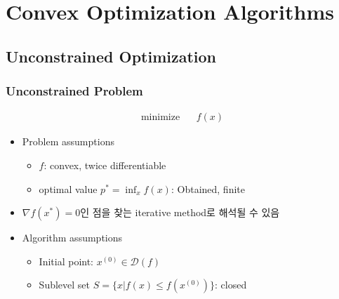\section{Convex Optimization Algorithms}

\subsection{Unconstrained Optimization}

\subsubsection*{Unconstrained Problem}
\begin{equation}\begin{aligned}
    \mathrm{minimize}~~&~~f(x)
\end{aligned}\end{equation}
\begin{itemize}
    \item Problem assumptions
    \begin{itemize}
        \item $f$: convex, twice differentiable
        \item optimal value $p^\ast = \inf_x f(x)$: Obtained, finite
    \end{itemize}
    \item $\nabla f(x^\ast) = 0$인 점을 찾는 iterative method로 해석될 수 있음
    \item Algorithm assumptions
    \begin{itemize}
        \item Initial point: $x^{(0)}\in\mathcal{D}(f)$
        \item Sublevel set $S = \{x|f(x)\leq f(x^{(0)})\}$: closed
    \end{itemize}
\end{itemize}

